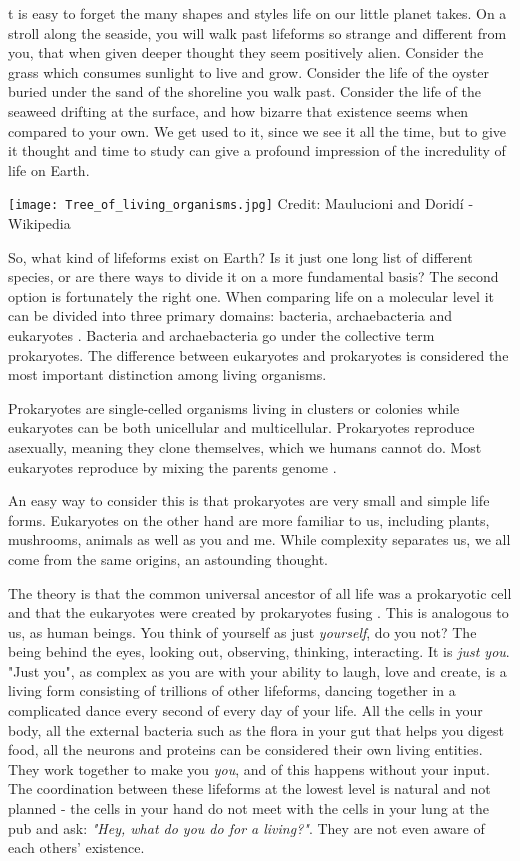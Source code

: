 t is easy to forget the many shapes and styles life on our little planet takes.
On a stroll along the seaside, you will walk past lifeforms so strange and different from you, that when given deeper thought they seem positively alien.
Consider the grass which consumes sunlight to live and grow.
Consider the life of the oyster buried under the sand of the shoreline you walk past.
Consider the life of the seaweed drifting at the surface, and how bizarre that existence seems when compared to your own.
We get used to it, since we see it all the time, but to give it thought and time to study can give a profound impression of the incredulity of life on Earth.

\begin{center}
	\texttt{[image: Tree\_of\_living\_organisms.jpg]}
	\tiny{Credit: Maulucioni and Dorid\'{i} - Wikipedia}
\end{center}

So, what kind of lifeforms exist on Earth?
Is it just one long list of different species, or are there ways to divide it on a more fundamental basis?
The second option is fortunately the right one.
When comparing life on a molecular level it can be divided into three primary domains: bacteria, archaebacteria and eukaryotes \cite{Eukaryotes}.
Bacteria and archaebacteria go under the collective term prokaryotes.
The difference between eukaryotes and prokaryotes is considered the most important distinction among living organisms.

Prokaryotes are single-celled organisms living in clusters or colonies while eukaryotes can be both unicellular and multicellular.
Prokaryotes reproduce asexually, meaning they clone themselves, which we humans cannot do.
Most eukaryotes reproduce by mixing the parents genome \cite{ProcaEuka}. 

An easy way to consider this is that prokaryotes are very small and simple life forms.
Eukaryotes on the other hand are more familiar to us, including plants, mushrooms, animals as well as you and me.
While complexity separates us, we all come from the same origins, an astounding thought.

The theory is that the common universal ancestor of all life was a prokaryotic cell and that the eukaryotes were created by prokaryotes fusing \cite{ProcaEuka}.
This is analogous to us, as human beings.
You think of yourself as just \textit {yourself}, do you not?
The being behind the eyes, looking out, observing, thinking, interacting.
It is \textit{just you}.
"Just you", as complex as you are with your ability to laugh, love and create, is a living form consisting of trillions of other lifeforms, dancing together in a complicated dance every second of every day of your life.
All the cells in your body, all the external bacteria such as the flora in your gut that helps you digest food, all the neurons and proteins can be considered their own living entities.
They work together to make you \textit{you}, and of this happens without your input.
The coordination between these lifeforms at the lowest level is natural and not planned - the cells in your hand do not meet with the cells in your lung at the pub and ask: \emph{"Hey, what do you do for a living?"}.
They are not even aware of each others' existence.

